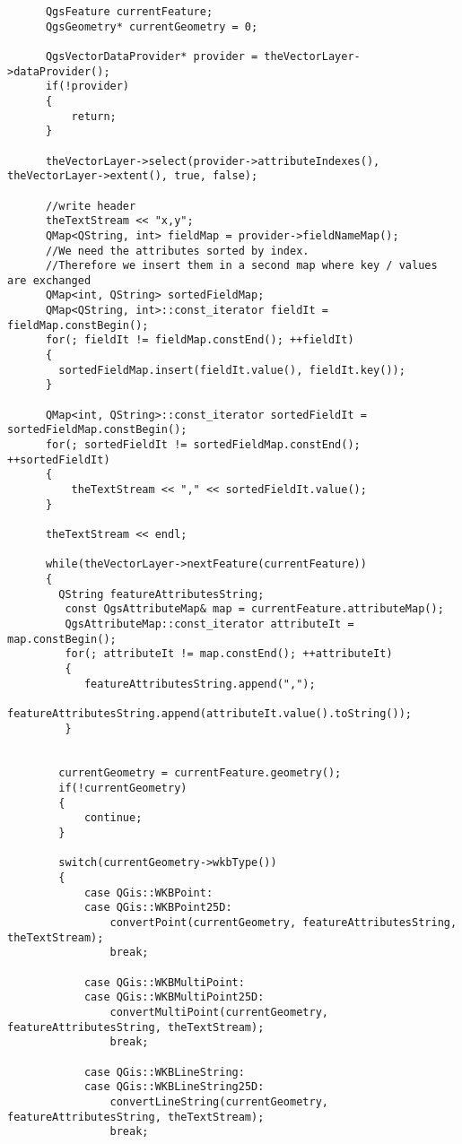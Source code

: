 \begin{verbatim}
      QgsFeature currentFeature;
      QgsGeometry* currentGeometry = 0;

      QgsVectorDataProvider* provider = theVectorLayer->dataProvider();
      if(!provider)
      {
          return;
      }

      theVectorLayer->select(provider->attributeIndexes(), theVectorLayer->extent(), true, false);

      //write header
      theTextStream << "x,y";
      QMap<QString, int> fieldMap = provider->fieldNameMap();
      //We need the attributes sorted by index.
      //Therefore we insert them in a second map where key / values are exchanged
      QMap<int, QString> sortedFieldMap;
      QMap<QString, int>::const_iterator fieldIt = fieldMap.constBegin();
      for(; fieldIt != fieldMap.constEnd(); ++fieldIt)
      {
        sortedFieldMap.insert(fieldIt.value(), fieldIt.key());
      }

      QMap<int, QString>::const_iterator sortedFieldIt = sortedFieldMap.constBegin();
      for(; sortedFieldIt != sortedFieldMap.constEnd(); ++sortedFieldIt)
      {
          theTextStream << "," << sortedFieldIt.value();
      }

      theTextStream << endl;

      while(theVectorLayer->nextFeature(currentFeature))
      {
        QString featureAttributesString;
         const QgsAttributeMap& map = currentFeature.attributeMap();
         QgsAttributeMap::const_iterator attributeIt = map.constBegin();
         for(; attributeIt != map.constEnd(); ++attributeIt)
         {
            featureAttributesString.append(",");
            featureAttributesString.append(attributeIt.value().toString());
         }


        currentGeometry = currentFeature.geometry();
        if(!currentGeometry)
        {
            continue;
        }

        switch(currentGeometry->wkbType())
        {
            case QGis::WKBPoint:
            case QGis::WKBPoint25D:
                convertPoint(currentGeometry, featureAttributesString, theTextStream);
                break;

            case QGis::WKBMultiPoint:
            case QGis::WKBMultiPoint25D:
                convertMultiPoint(currentGeometry, featureAttributesString, theTextStream);
                break;

            case QGis::WKBLineString:
            case QGis::WKBLineString25D:
                convertLineString(currentGeometry, featureAttributesString, theTextStream);
                break;


\end{verbatim}
